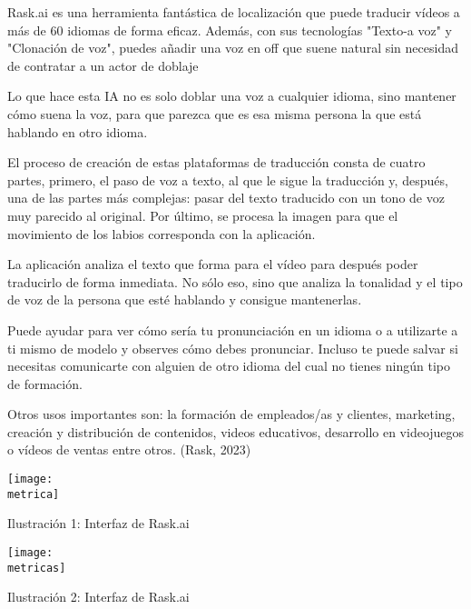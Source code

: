 \begin{doublespace} 

Rask.ai es una herramienta fantástica de localización que puede traducir vídeos
a más de 60 idiomas de forma eficaz. Además, con sus tecnologías "Texto-a voz" y
"Clonación de voz", puedes añadir una voz en off que suene natural sin necesidad de
contratar a un actor de doblaje \par

Lo que hace esta IA no es solo doblar una voz a cualquier idioma, sino mantener
cómo suena la voz, para que parezca que es esa misma persona la que está hablando
en otro idioma.\par

El proceso de creación de estas plataformas de traducción consta de cuatro
partes, primero, el paso de voz a texto, al que le sigue la traducción y, después, una de
las partes más complejas: pasar del texto traducido con un tono de voz muy parecido al
original. Por último, se procesa la imagen para que el movimiento de los labios
corresponda con la aplicación.\par

La aplicación analiza el texto que forma para el vídeo para después poder
traducirlo de forma inmediata. No sólo eso, sino que analiza la tonalidad y el tipo de
voz de la persona que esté hablando y consigue mantenerlas.\par


Puede ayudar para ver cómo sería tu pronunciación en un idioma o a utilizarte a
ti mismo de modelo y observes cómo debes pronunciar. Incluso te puede salvar si
necesitas comunicarte con alguien de otro idioma del cual no tienes ningún tipo de
formación.\par

Otros usos importantes son: la formación de empleados/as y clientes, marketing,
creación y distribución de contenidos, videos educativos, desarrollo en videojuegos o
vídeos de ventas entre otros. (Rask, 2023)\par\vspace{0.3cm}

\centering
\texttt{[image: \\metrica]}\par\vspace{0.3cm}
Ilustración 1: Interfaz de Rask.ai



\centering
\texttt{[image: \\metricas]}\par\vspace{0.3cm}
Ilustración 2: Interfaz de Rask.ai


\clearpage  %



\clearpage  %

\end{doublespace}